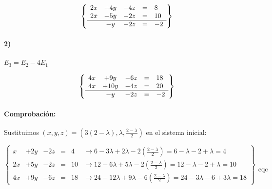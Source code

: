 \documentclass[palatino,nosec,nochap]{Docencia}
\begin{document}
\begin{problem}
\[
\left\{\begin{array}{lcccl}
2x&+4y&-4z&=&8\\
2x&+5y&-2z&=&10\\
\hline
&-y&-2z&=&-2 
\end{array}\right\}
\]

\paragraph{2)} $E_3=E_2-4E_1$

\[
\left\{\begin{array}{lcccl}
4x&+9y&-6z&=&18\\
4x&+10y&-4z&=&20\\
\hline
&-y&-2z&=&-2 
\end{array}\right\}
\]


\paragraph*{Comprobación:} Sustituimos $(x,y,z) = \left(3(2-λ),λ,\frac{2-λ}{2}\right)$ en el sistema inicial:


\[
\left\{\begin{array}{lcccll}
x&+2y&-2z&=&4 &\to 6-3λ + 2λ - 2\displaystyle\left(\frac{2-λ}{2}\right) = 6-λ-2+λ = 4\\
2x&+5y&-2z&=&10 &\to 12-6λ +5λ - 2\displaystyle\left(\frac{2-λ}{2}\right) = 12-λ-2+λ = 10\\
4x&+9y&-6z&=&18 &\to 24-12λ + 9λ - 6\displaystyle\left(\frac{2-λ}{2}\right) = 24-3λ-6+3λ = 18
\end{array}\right\}\begin{array}{c}\\\\\\\\\text{cqc}\end{array}
\]

\end{problem}
\end{document}
